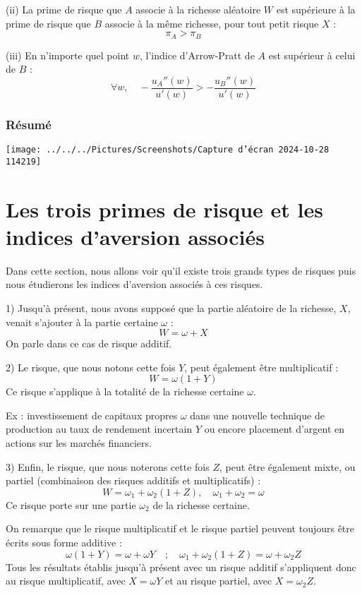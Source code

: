 \documentclass[a4paper, 12pt]{report}
\begin{document}
(ii) La prime de risque que \( A \) associe à la richesse aléatoire \( W \) est supérieure à la prime de risque que \( B \) associe à la même richesse, pour tout petit risque \( X \) :
\[
\pi_A > \pi_B
\]

(iii) En n'importe quel point \( w \), l'indice d'Arrow-Pratt de \( A \) est supérieur à celui de \( B \) :
\[
\forall w, \quad -\frac{u_A''(w)}{u'(w)} > -\frac{u_B''(w)}{u'(w)}
\]

\subsubsection{Résumé}
\begin{center}
	\texttt{[image: ../../../Pictures/Screenshots/Capture d'écran 2024-10-28 114219]}
\end{center}

\section{Les trois primes de risque et les indices d'aversion associés}

Dans cette section, nous allons voir qu'il existe trois grands types de risques puis nous étudierons les indices d'aversion associés à ces risques.

1) Jusqu'à présent, nous avons supposé que la partie aléatoire de la richesse, \( X \), venait s'ajouter à la partie certaine \( \omega \) : 
\[
W = \omega + X
\]
On parle dans ce cas de risque additif.

2) Le risque, que nous notons cette fois \( Y \), peut également être multiplicatif : 
\[
W = \omega (1 + Y)
\]
Ce risque s'applique à la totalité de la richesse certaine \( \omega \).

Ex : investissement de capitaux propres \( \omega \) dans une nouvelle technique de production au taux de rendement incertain \( Y \) ou encore placement d'argent en actions sur les marchés financiers.

3) Enfin, le risque, que nous noterons cette fois \( Z \), peut être également mixte, ou partiel (combinaison des risques additifs et multiplicatifs) :
\[
W = \omega_1 + \omega_2(1 + Z), \quad \omega_1 + \omega_2 = \omega
\]
Ce risque porte sur une partie \( \omega_2 \) de la richesse certaine.

On remarque que le risque multiplicatif et le risque partiel peuvent toujours être écrits sous forme additive :
\[
\omega(1 + Y)= \omega + \omega Y\quad ; \quad \omega_1 + \omega_2(1 + Z) = \omega + \omega_2 Z
\]
Tous les résultats établis jusqu'à présent avec un risque additif s'appliquent donc au risque multiplicatif, avec \( X = \omega Y \) et au risque partiel, avec \( X = \omega_2 Z \).
\end{document}
